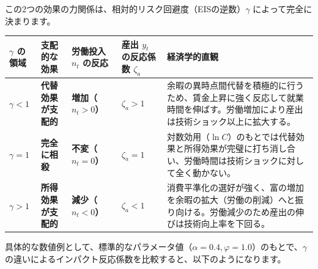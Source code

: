 \documentclass[
  japanese,
  lualatex,
  ja=standard,
  12pt,
  a4paper]{ltjsarticle}
\newcounter{none} %
\begin{document}
この2つの効果の力関係は、相対的リスク回避度（EISの逆数）\(\gamma\)
によって完全に決まります。

{\def\LTcaptype{none} %
\begin{longtable}[]{@{}
  >{\raggedright\arraybackslash}p{}
  >{\raggedright\arraybackslash}p{}
  >{\raggedright\arraybackslash}p{}
  >{\raggedright\arraybackslash}p{}
  >{\raggedright\arraybackslash}p{}@{}}
\toprule\noalign{}
\begin{minipage}[b]{\linewidth}\raggedright
\(\gamma\) の領域
\end{minipage} & \begin{minipage}[b]{\linewidth}\raggedright
支配的な効果
\end{minipage} & \begin{minipage}[b]{\linewidth}\raggedright
労働投入 \(n_t\) の反応
\end{minipage} & \begin{minipage}[b]{\linewidth}\raggedright
産出 \(y_t\) の反応係数 \(\zeta_a\)
\end{minipage} & \begin{minipage}[b]{\linewidth}\raggedright
経済学的直観
\end{minipage} \\
\midrule\noalign{}
\endhead
\bottomrule\noalign{}
\endlastfoot
\textbf{\(\gamma < 1\)} & \textbf{代替効果が支配的} &
\textbf{増加（\(n_t > 0\)）} & \textbf{\(\zeta_a > 1\)} &
余暇の異時点間代替を積極的に行うため、賃金上昇に強く反応して就業時間を伸ばす。労働増加により産出は技術ショック以上に拡大する。 \\
\textbf{\(\gamma = 1\)} & \textbf{完全に相殺} &
\textbf{不変（\(n_t = 0\)）} & \textbf{\(\zeta_a = 1\)} &
対数効用（\(\ln C\)）のもとでは代替効果と所得効果が完璧に打ち消し合い、労働時間は技術ショックに対して全く動かない。 \\
\textbf{\(\gamma > 1\)} & \textbf{所得効果が支配的} &
\textbf{減少（\(n_t < 0\)）} & \textbf{\(\zeta_a < 1\)} &
消費平準化の選好が強く、富の増加を余暇の拡大（労働の削減）へと振り向ける。労働減少のため産出の伸びは技術向上率を下回る。 \\
\end{longtable}
}

具体的な数値例として、標準的なパラメータ値（\(\alpha = 0.4, \varphi = 1.0\)）のもとで、\(\gamma\)
の違いによるインパクト反応係数を比較すると、以下のようになります。
\end{document}
